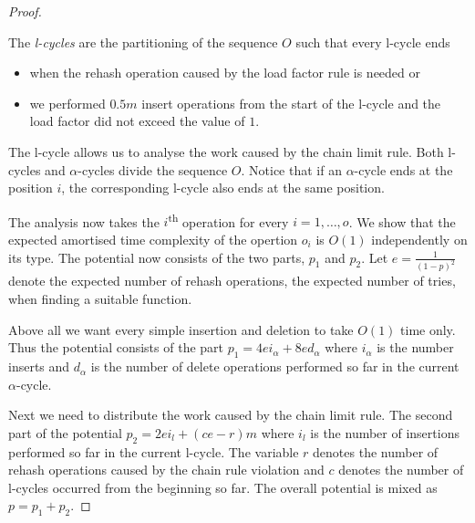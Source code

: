 \begin{proof}
\begin{definition}[l-cycle]
The \emph{l-cycles} are the partitioning of the sequence $O$ such that every l-cycle ends
\begin{itemize}
\item when the rehash operation caused by the load factor rule is needed or
\item we performed $0.5 m$ insert operations from the start of the l-cycle and the load factor did not exceed the value of $1$.
\end{itemize}
\end{definition}
The l-cycle allows us to analyse the work caused by the chain limit rule. Both l-cycles and $\alpha$-cycles divide the sequence $O$. Notice that if an $\alpha$-cycle ends at the position $i$, the corresponding l-cycle also ends at the same position. 

The analysis now takes the $i$\textsuperscript{th} operation for every $i = 1, \dots, o$. We show that the expected amortised time complexity of the opertion $o_i$ is $O(1)$ independently on its type. The potential now consists of the two parts, $p_1$ and $p_2$. Let $e = \frac{1}{(1 - p) ^ 2}$ denote the expected number of rehash operations, the expected number of tries, when finding a suitable function. 

Above all we want every simple insertion and deletion to take $O(1)$ time only. Thus the potential consists of the part $p_1 = 4ei_{\alpha} + 8ed_{\alpha}$ where $i_{\alpha}$ is the number inserts and $d_{\alpha}$ is the number of delete operations performed so far in the current $\alpha$-cycle. 

Next we need to distribute the work caused by the chain limit rule. The second part of the potential $p_2 = 2ei_{l} + (ce - r) m$ where $i_l$ is the number of insertions performed so far in the current l-cycle. The variable $r$ denotes the number of rehash operations caused by the chain rule violation and $c$ denotes the number of l-cycles occurred from the beginning so far. The overall potential is mixed as $p = p_1 + p_2$.


\end{proof}
